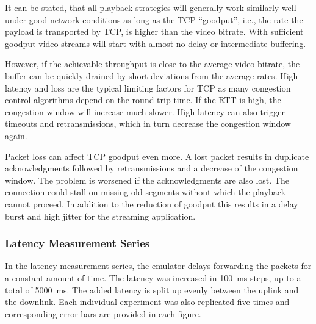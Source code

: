 It can be stated, that all playback strategies will generally work similarly well under good network conditions as long as the \gls{TCP} ``goodput'', i.e., the rate the payload is transported by \gls{TCP}, is higher than the video bitrate. With sufficient goodput video streams will start with almost no delay or intermediate buffering. 

However, if the achievable throughput is close to the average video bitrate, the buffer can be quickly drained by short deviations from the average rates. High latency and loss are the typical limiting factors for \gls{TCP} as many congestion control algorithms depend on the round trip time. If the \gls{RTT} is high, the congestion window will increase much slower. High latency can also trigger  timeouts and retransmissions, which in turn decrease the congestion window again. 

Packet loss can affect \gls{TCP} goodput even more. A lost packet results in duplicate acknowledgments followed by retransmissions and a decrease of the congestion window. The problem is worsened if the acknowledgments are also lost. The connection could stall on missing old segments without which the playback cannot proceed. In addition to the reduction of goodput this results in a delay burst and high jitter for the streaming application.


\subsubsection{Latency Measurement Series}

In the latency measurement series, the emulator delays forwarding the packets for a constant amount of time. The latency was increased in \SI{100}{\milli\second} steps, up to a total of \SI{5000}{\milli\second}. The added latency is split up evenly between the uplink and the downlink. Each individual experiment was also replicated five times and corresponding error bars are provided in each figure.

